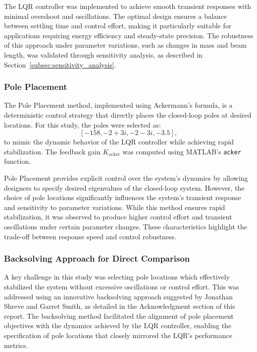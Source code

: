 \documentclass[conference]{IEEEtran}
\begin{document}
The LQR controller was implemented to achieve smooth transient responses with minimal overshoot and oscillations. The optimal design ensures a balance between settling time and control effort, making it particularly suitable for applications requiring energy efficiency and steady-state precision. The robustness of this approach under parameter variations, such as changes in mass and beam length, was validated through sensitivity analysis, as described in Section~\ref{subsec:sensitivity_analysis}.

\subsubsection{Pole Placement}
\label{subsubsec:pole_placement}
The Pole Placement method, implemented using Ackermann’s formula, is a deterministic control strategy that directly places the closed-loop poles at desired locations. For this study, the poles were selected as:
\[
[-158, -2+3i, -2-3i, -3.5],
\]
to mimic the dynamic behavior of the LQR controller while achieving rapid stabilization. The feedback gain \(K_{\text{acker}}\) was computed using MATLAB’s \texttt{acker} function.

Pole Placement provides explicit control over the system’s dynamics by allowing designers to specify desired eigenvalues of the closed-loop system. However, the choice of pole locations significantly influences the system's transient response and sensitivity to parameter variations. While this method ensures rapid stabilization, it was observed to produce higher control effort and transient oscillations under certain parameter changes. These characteristics highlight the trade-off between response speed and control robustness.

\subsubsection{Backsolving Approach for Direct Comparison}
\label{subsubsec:backsolving}
A key challenge in this study was selecting pole locations which effectively stabilized the system without excessive oscillations or control effort. This was addressed using an innovative backsolving approach suggested by Jonathan Shreve and Garret Smith, as detailed in the Acknowledgment section of this report. The backsolving method facilitated the alignment of pole placement objectives with the dynamics achieved by the LQR controller, enabling the specification of pole locations that closely mirrored the LQR's performance metrics.
\end{document}
